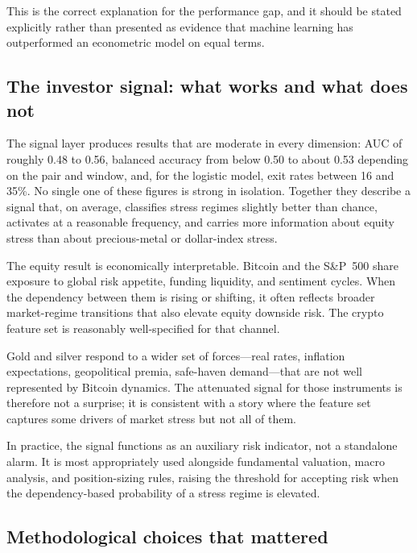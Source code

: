 This is the correct explanation for the performance gap, and it should be stated explicitly rather than presented as evidence that machine learning has outperformed an econometric model on equal terms.

\subsection{The investor signal: what works and what does not}

The signal layer produces results that are moderate in every dimension: AUC of roughly 0.48 to 0.56, balanced accuracy from below 0.50 to about 0.53 depending on the pair and window, and, for the logistic model, exit rates between 16 and 35\%. No single one of these figures is strong in isolation. Together they describe a signal that, on average, classifies stress regimes slightly better than chance, activates at a reasonable frequency, and carries more information about equity stress than about precious-metal or dollar-index stress.

The equity result is economically interpretable. Bitcoin and the S\&P~500 share exposure to global risk appetite, funding liquidity, and sentiment cycles. When the dependency between them is rising or shifting, it often reflects broader market-regime transitions that also elevate equity downside risk. The crypto feature set is reasonably well-specified for that channel.

Gold and silver respond to a wider set of forces---real rates, inflation expectations, geopolitical premia, safe-haven demand---that are not well represented by Bitcoin dynamics. The attenuated signal for those instruments is therefore not a surprise; it is consistent with a story where the feature set captures some drivers of market stress but not all of them.

In practice, the signal functions as an auxiliary risk indicator, not a standalone alarm. It is most appropriately used alongside fundamental valuation, macro analysis, and position-sizing rules, raising the threshold for accepting risk when the dependency-based probability of a stress regime is elevated.

\subsection{Methodological choices that mattered}

